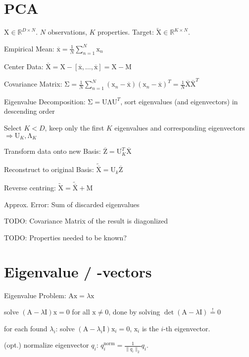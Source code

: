 \documentclass[a4paper, 11pt, landscape]{article}
\newcommand{\matr}[1]{\boldsymbol{\mathrm{#1}}}
\begin{document}
\begin{multicols*}{3}

\section{PCA}
$\matr{X} \in \mathbb{R}^{D \times N}$. $N$ observations, $K$ properties. Target: $\tilde{\matr{X}} \in \mathbb{R}^{K \times N}$.
\begin{compactenum}
	\item Empirical Mean: $\overline{\matr{x}} = \frac{1}{N} \sum_{n=1}^N \matr{x}_n$
	\item Center Data: $\overline{\matr{X}} = \matr{X} - [\overline{\matr{x}}, \ldots, \overline{\matr{x}}] = \matr{X} - \matr{M}$
	\item Covariance Matrix: $\matr{\Sigma} = \frac{1}{N	} \sum_{n=1}^N (\matr{x}_n - \overline{\matr{x}}) (\matr{x}_n - \overline{\matr{x}})^T = \frac{1}{N} \overline{\matr{X}}\overline{\matr{X}}^T$
	\item Eigenvalue Decomposition: $\matr{\Sigma} = \matr{U \Lambda U}^T$, sort eigenvalues (and eigenvectors) in descending order
	\item Select $K < D$, keep only the first $K$ eigenvalues and corresponding eigenvectors $\Rightarrow \matr{U}_K, \matr{\Lambda}_K$
	\item Transform data onto new Basis: $\overline{\matr{Z}} = \matr{U}_K^T \overline{\matr{X}}$
	\item Reconstruct to original Basis: $\tilde{\overline{\matr{X}}} = \matr{U}_k \overline{\matr{Z}}$
	\item Reverse centring: $\tilde{\matr{X}} = \tilde{\overline{\matr{X}}} + \matr{M}$
\end{compactenum}

\begin{compactdesc}
	\item[Approx. Error:] Sum of discarded eigenvalues
\end{compactdesc}

\begin{compactitem}
	\item TODO: Covariance Matrix of the result is diagonlized
	\item TODO: Properties needed to be known?
\end{compactitem}

\section{Eigenvalue / -vectors}
Eigenvalue Problem: $\matr{Ax} = \lambda \matr{x}$
\begin{compactenum}
	\item solve $(\matr{A} - \lambda \matr{I}) \matr{x} = \matr{0}$ for all $\matr{x} \neq \matr{0}$, done by solving $\operatorname{det}(\matr{A} - \lambda \matr{I}) \overset{!}{=} 0$
	\item for each found $\lambda_i$:
		solve $(\matr{A} - \lambda_i \matr{I}) \matr{x}_i = \matr{0}$, $\matr{x}_i$ is the $i$-th eigenvector.
	\item (opt.) normalize eigenvector $q_i$: $q_i^{\text{norm}} = \frac{1}{\|q_i\|_2} q_i$.
\end{compactenum}


\end{multicols*}
\end{document}
